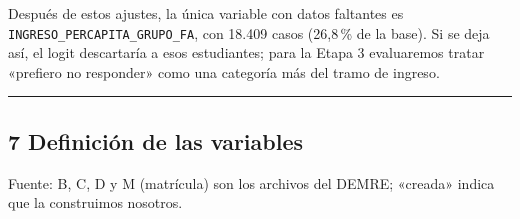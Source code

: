 \documentclass[11pt]{article}
\begin{document}
Después de estos ajustes, la única variable con datos faltantes es
\texttt{INGRESO\_PERCAPITA\_GRUPO\_FA}, con 18.409 casos (26,8\,\% de
la base). Si se deja así, el logit descartaría a esos estudiantes; para
la Etapa 3 evaluaremos tratar «prefiero no responder» como una categoría
más del tramo de ingreso.

\medskip\hrule\medskip

\subsection*{7 \; Definición de las variables}

Fuente: B, C, D y M (matrícula) son los archivos del DEMRE; «creada»
indica que la construimos nosotros.
\end{document}
